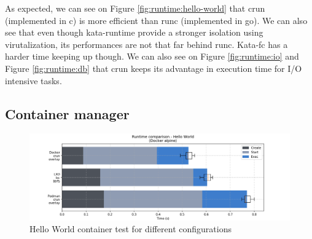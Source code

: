 As expected, we can see on Figure \ref{fig:runtime:hello-world} that crun (implemented in c) is more efficient than runc (implemented in go).  We can also see that even though kata-runtime provide a stronger isolation using virutalization, its performances are not that far behind runc.  Kata-fc has a harder time keeping up though.  We can also see on Figure \ref{fig:runtime:io} and Figure \ref{fig:runtime:db} that crun keeps its advantage in execution time for I/O intensive tasks.

\clearpage
\subsection{Container manager}

\begin{figure}[h!]
  \begin{center}
    \includegraphics[width=\linewidth]{images/manager/manager-Hello-World-alpine.png}
    \caption{Hello World container test for different configurations}
    \label{fig:manager:hello-world}
  \end{center}
\end{figure}

